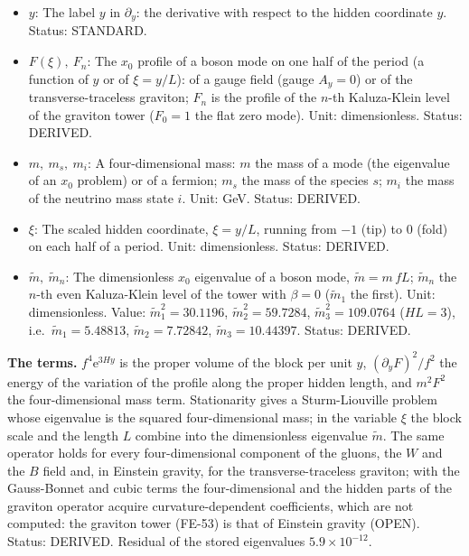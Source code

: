 \documentclass[
  10pt,
]{article}
\begin{document}
\begin{itemize}
  with respect to the coordinate \(X^M\), \(\partial_y\) with respect to
  \(y\), \(\partial_{x_4}\) with respect to the time \(x_4\),
  \(\partial X/\partial Y\) the derivative of \(X\) with respect to
  \(Y\) at fixed other variables. Status: STANDARD.
\item
  \(y\): The label \(y\) in \(\partial_y\): the derivative with respect
  to the hidden coordinate \(y\). Status: STANDARD.
\item
  \(F(\xi),\ F_n\): The \(x_0\) profile of a boson mode on one half of
  the period (a function of \(y\) or of \(\xi = y/L\)): of a gauge field
  (gauge \(A_y = 0\)) or of the transverse-traceless graviton; \(F_n\)
  is the profile of the \(n\)-th Kaluza-Klein level of the graviton
  tower (\(F_0 = 1\) the flat zero mode). Unit: dimensionless. Status:
  DERIVED.
\item
  \(m,\ m_s,\ m_i\): A four-dimensional mass: \(m\) the mass of a mode
  (the eigenvalue of an \(x_0\) problem) or of a fermion; \(m_s\) the
  mass of the species \(s\); \(m_i\) the mass of the neutrino mass state
  \(i\). Unit: GeV. Status: DERIVED.
\item
  \(\xi\): The scaled hidden coordinate, \(\xi = y/L\), running from
  \(-1\) (tip) to \(0\) (fold) on each half of a period. Unit:
  dimensionless. Status: DERIVED.
\item
  \(\tilde m,\ \tilde m_n\): The dimensionless \(x_0\) eigenvalue of a
  boson mode, \(\tilde m = m\,fL\); \(\tilde m_n\) the \(n\)-th even
  Kaluza-Klein level of the tower with \(\beta = 0\) (\(\tilde m_1\) the
  first). Unit: dimensionless. Value: \(\tilde m_1^2 = 30.1196\),
  \(\tilde m_2^2 = 59.7284\), \(\tilde m_3^2 = 109.0764\) (\(HL = 3\)),
  i.e.~\(\tilde m_1 = 5.48813\), \(\tilde m_2 = 7.72842\),
  \(\tilde m_3 = 10.44397\). Status: DERIVED.
\end{itemize}

\textbf{The terms.} \(f^4\mathrm{e}^{3Hy}\) is the proper volume of the
block per unit \(y\), \((\partial_yF)^2/f^2\) the energy of the
variation of the profile along the proper hidden length, and \(m^2F^2\)
the four-dimensional mass term. Stationarity gives a Sturm-Liouville
problem whose eigenvalue is the squared four-dimensional mass; in the
variable \(\xi\) the block scale and the length \(L\) combine into the
dimensionless eigenvalue \(\tilde m\). The same operator holds for every
four-dimensional component of the gluons, the \(W\) and the \(B\) field
and, in Einstein gravity, for the transverse-traceless graviton; with
the Gauss-Bonnet and cubic terms the four-dimensional and the hidden
parts of the graviton operator acquire curvature-dependent coefficients,
which are not computed: the graviton tower (FE-53) is that of Einstein
gravity (OPEN). Status: DERIVED. Residual of the stored eigenvalues
\(5.9\times10^{-12}\).
\end{document}
